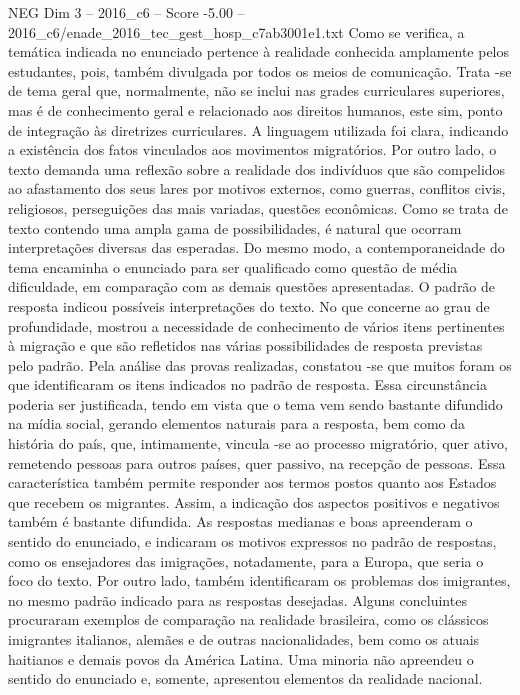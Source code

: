\begin{textsample}{NEG Dim 3 – 2016\_c6 – Score -5.00 – 2016\_c6/enade\_2016\_tec\_gest\_hosp\_c7ab3001e1.txt}
Como se verifica, a temática indicada no enunciado pertence à realidade conhecida amplamente pelos estudantes, pois, também divulgada por todos os meios de comunicação.
Trata -se de tema geral que, normalmente, não se inclui nas grades curriculares superiores, mas é de conhecimento geral e relacionado aos direitos humanos, este sim, ponto de integração às diretrizes curriculares.
A linguagem utilizada foi clara, indicando a existência dos fatos vinculados aos movimentos migratórios.
Por outro lado, o texto demanda uma reflexão sobre a realidade dos indivíduos que são compelidos ao afastamento dos seus lares por motivos externos, como guerras, conflitos civis, religiosos, perseguições das mais variadas, questões econômicas.
Como se trata de texto contendo uma ampla gama de possibilidades, é natural que ocorram interpretações diversas das esperadas.
Do mesmo modo, a contemporaneidade do tema encaminha o enunciado para ser qualificado como questão de média dificuldade, em comparação com as demais questões apresentadas.
O padrão de resposta indicou possíveis interpretações do texto.
No que concerne ao grau de profundidade, mostrou a necessidade de conhecimento de vários itens pertinentes à migração e que são refletidos nas várias possibilidades de resposta previstas pelo padrão.
Pela análise das provas realizadas, constatou -se que muitos foram os que identificaram os itens indicados no padrão de resposta.
Essa circunstância poderia ser justificada, tendo em vista que o tema vem sendo bastante difundido na mídia social, gerando elementos naturais para a resposta, bem como da história do país, que, intimamente, vincula -se ao processo migratório, quer ativo, remetendo pessoas para outros países, quer passivo, na recepção de pessoas.
Essa característica também permite responder aos termos postos quanto aos Estados que recebem os migrantes.
Assim, a indicação dos aspectos positivos e negativos também é bastante difundida.
As respostas medianas e boas apreenderam o sentido do enunciado, e indicaram os motivos expressos no padrão de respostas, como os ensejadores das imigrações, notadamente, para a Europa, que seria o foco do texto.
Por outro lado, também identificaram os problemas dos imigrantes, no mesmo padrão indicado para as respostas desejadas.
Alguns concluintes procuraram exemplos de comparação na realidade brasileira, como os clássicos imigrantes italianos, alemães e de outras nacionalidades, bem como os atuais haitianos e demais povos da América Latina.
Uma minoria não apreendeu o sentido do enunciado e, somente, apresentou elementos da realidade nacional.

\end{textsample}
